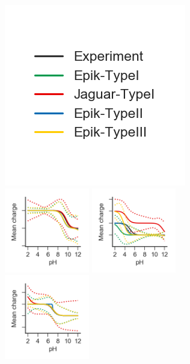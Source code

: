 \documentclass[9pt,lineno,final]{elife}
\begin{document}
    
\begin{figure}[H]
	\centering
	\includegraphics[]{Reports/overview-legend-SM01.png}	\\
	\includegraphics[width=0.33\textwidth]{Reports/overview-virtual-titration-SM01.png}
	\includegraphics[width=0.33\textwidth]{Reports/overview-virtual-titration-SM02.png}
	\includegraphics[width=0.33\textwidth]{Reports/overview-virtual-titration-SM03.png}	 \\

\end{figure}
\end{document}
